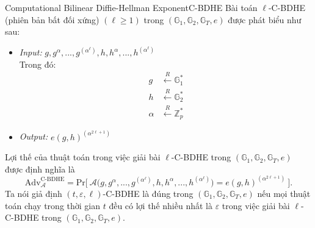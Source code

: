 \documentclass[class=report, crop=false]{standalone}
\begin{document}
			\begin{problem}{Computational Bilinear Diffie-Hellman Exponent}{C-BDHE}
				Bài toán $\ell$-C-BDHE (phiên bản bất đối xứng) $(\ell \geq 1)$ trong $(\mathbb{G}_1, \mathbb{G}_2, \mathbb{G}_T, e)$ được phát biểu như sau:
				\vspace{-\baselineskip}
				\begin{itemize}[leftmargin=1.5cm, itemindent=-0.5cm]
					\item[] \textit{Input:} $g, g^\alpha, ..., g^{(\alpha^\ell)}, h, h^\alpha, ..., h^{(\alpha^\ell)}$ \\
					Trong đó: \vspace{-\baselineskip}
					\begin{align*}
						g 		&\xleftarrow{R} \mathbb{G}_1^* \\
						h 		&\xleftarrow{R} \mathbb{G}_2^* \\
						\alpha 	&\xleftarrow{R} \mathbb{Z}_p^*
					\end{align*}
					\item[] \textit{Output:} $e(g, h)^{(\alpha^{2\ell + 1})}$
				\end{itemize}
				\vspace{-\baselineskip}\par
				Lợi thế của thuật toán \algo trong việc giải bài $\ell$-C-BDHE trong $(\mathbb{G}_1, \mathbb{G}_2, \mathbb{G}_T, e)$ được định nghĩa là
				\[
					\text{Adv}_{\mathcal{A}}^{\text{C-BDHE}} = \text{Pr}\bigg[ \ \mathcal{A}\Big(g, g^\alpha, ..., g^{(\alpha^\ell)}, h, h^\alpha, ..., h^{(\alpha^\ell)} \Big) = e(g, h)^{(\alpha^{2\ell + 1})} \ \bigg].
				\] \indent
				Ta nói giả định $(t, \varepsilon, \ell)$-C-BDHE là đúng trong $(\mathbb{G}_1, \mathbb{G}_2, \mathbb{G}_T, e)$ nếu mọi thuật toán chạy trong thời gian $t$ đều có lợi thế nhiều nhất là $\varepsilon$ trong việc giải bài $\ell$-C-BDHE trong $(\mathbb{G}_1, \mathbb{G}_2, \mathbb{G}_T, e)$.
			\end{problem}
\end{document}
